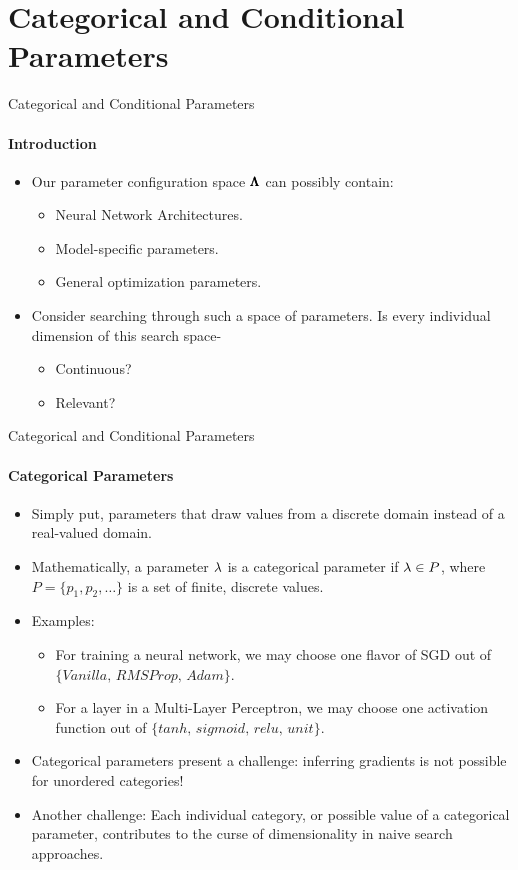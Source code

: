 \section{Categorical and Conditional Parameters}
\begin{frame}[c]{Categorical and Conditional Parameters}
\framesubtitle{Introduction}
\pause
\begin{itemize}
    \item<+->{Our parameter configuration space $\pmb{\Lambda}$ can possibly contain:
    \begin{itemize}
        \item<+->{Neural Network Architectures.}
        \item<+->{Model-specific parameters.}
        \item<+->{General optimization parameters.} 
    \end{itemize}
    }
    \item<+->{Consider searching through such a space of parameters. Is every individual dimension of this search space-
    \begin{itemize}
        \item<+->{Continuous?}
        \item<+->{Relevant?}
    \end{itemize}
    }
\end{itemize}
\end{frame}
\begin{frame}[c]{Categorical and Conditional Parameters}
\framesubtitle{Categorical Parameters}
\pause
\begin{itemize}
    \item<+-> Simply put, parameters that draw values from a discrete domain instead of a real-valued domain.
    \item<+-> Mathematically, a parameter $\lambda$ is a categorical parameter if $\lambda\in P$, where $P=\{p_1, p_2, \dots\}$ is a set of finite, discrete values.
    \item<+-> Examples:
    \begin{itemize}
        \item<+-> For training a neural network, we may choose one flavor of SGD out of $\{Vanilla, \,RMSProp, \,Adam\}$.
        \item<+-> For a layer in a Multi-Layer Perceptron, we may choose one activation function out of $\{tanh, \,sigmoid, \,relu, \,unit\}$.
    \end{itemize}
    \item<+-> Categorical parameters present a challenge: inferring gradients is not possible for unordered categories!
    \item<+-> Another challenge: Each individual category, or possible value of a categorical parameter, contributes to the curse of dimensionality in naive search approaches.
\end{itemize}
\end{frame}
